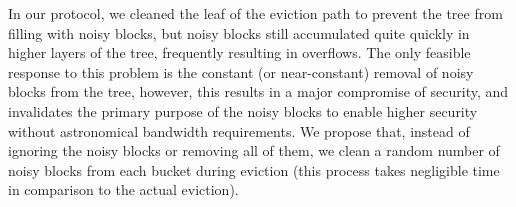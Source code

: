 \documentclass[12pt, oneside]{article}   	%
\begin{document}
In our protocol, we cleaned the leaf of the eviction path to prevent the tree from filling with noisy blocks, but noisy blocks still accumulated quite quickly in higher layers of the tree, frequently resulting in overflows. The only feasible response to this problem is the constant (or near-constant) removal of noisy blocks from the tree, however, this results in a major compromise of security, and invalidates the primary purpose of the noisy blocks to enable higher security without astronomical bandwidth requirements. We propose that, instead of ignoring the noisy blocks or removing all of them, we clean a random number of noisy blocks from each bucket during eviction (this process takes negligible time in comparison to the actual eviction).
\end{document}

